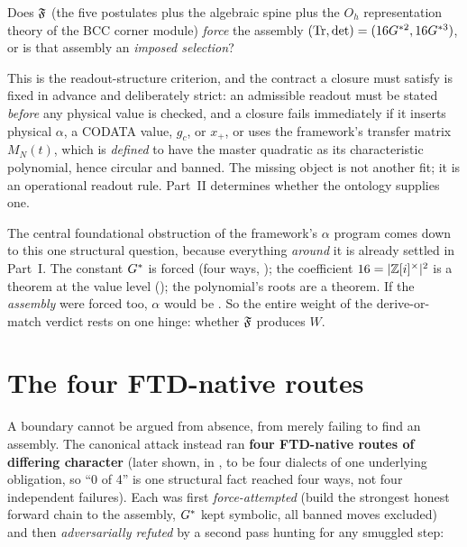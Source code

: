 \begin{boundarybox}
Does $\mathfrak{F}$ (the five postulates plus the algebraic spine plus the
$O_h$ representation theory of the BCC corner module) \emph{force} the
assembly $(\operatorname{Tr},\operatorname{det})=(16G^{*2},16G^{*3})$, or is that assembly an \emph{imposed
selection}?
\end{boundarybox}

\noindent This is the readout-structure criterion, and the contract a closure
must satisfy is fixed in advance and deliberately strict: an admissible readout
must be stated \emph{before} any physical value is checked, and a closure fails
immediately if it inserts physical $\alpha$, a CODATA value, $g_c$, or $x_+$, or
uses the framework's transfer matrix $M_N(t)$, which is \emph{defined} to
have the master quadratic as its characteristic polynomial, hence circular and
banned. The missing object is not another fit; it is an operational readout rule.
Part~II determines whether the ontology supplies one.

 The central foundational
obstruction of the framework's $\alpha$ program comes down to this one structural
question, because everything \emph{around} it is already settled in Part~I. The
constant $G^{*}$ is forced (four ways, ); the coefficient
$16=|\mathbb{Z}[i]^{\times}|^2$ is a theorem at the value level (); the
polynomial's roots are a theorem. If the \emph{assembly} were forced too, $\alpha$
would be . So the entire weight of the derive-or-match verdict rests on
one hinge: whether $\mathfrak{F}$ produces $W$.

\section{The four FTD-native routes}\label{sec:routes}
A boundary cannot be argued from absence, from merely failing to find an
assembly. The canonical attack instead ran \textbf{four FTD-native routes of
differing character} (later shown, in , to be four dialects
of one underlying obligation, so ``0 of 4'' is one structural fact reached four
ways, not four independent failures). Each was first \emph{force-attempted} (build
the strongest honest forward chain to the assembly, $G^{*}$ kept symbolic, all
banned moves excluded) and then \emph{adversarially refuted} by a second pass
hunting for any smuggled step:


